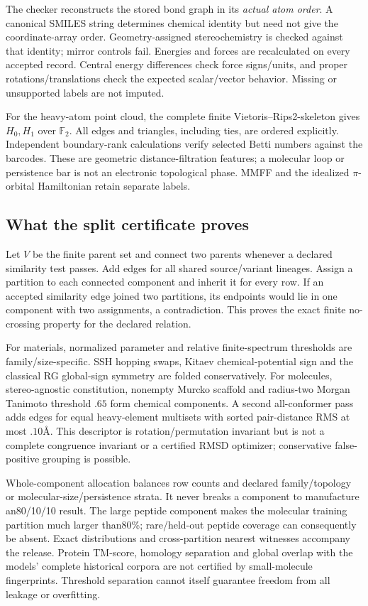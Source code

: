 \documentclass[11pt,oneside,openany]{book}
\theoremstyle{definition}\newtheorem{definition}[theorem]{Definition}
\theoremstyle{remark}\newtheorem{remark}[theorem]{Remark}
\begin{document}
The checker reconstructs the stored bond graph in its \emph{actual atom order}.
A canonical SMILES string determines chemical identity but need not give the
coordinate-array order. Geometry-assigned stereochemistry is checked against
that identity; mirror controls fail. Energies and forces are recalculated on
every accepted record. Central energy differences check force signs/units,
and proper rotations/translations check the expected scalar/vector behavior.
Missing or unsupported labels are not imputed.

For the heavy-atom point cloud, the complete finite Vietoris--Rips2-skeleton
gives $H_0,H_1$ over $\mathbb F_2$. All edges and triangles, including ties,
are ordered explicitly. Independent boundary-rank calculations verify selected
Betti numbers against the barcodes. These are geometric distance-filtration
features; a molecular loop or persistence bar is not an electronic topological
phase. MMFF and the idealized $\pi$-orbital Hamiltonian retain separate labels.

\subsection{What the split certificate proves}
Let $V$ be the finite parent set and connect two parents whenever a declared
similarity test passes. Add edges for all shared source/variant lineages.
Assign a partition to each connected component and inherit it for every row.
If an accepted similarity edge joined two partitions, its endpoints would lie
in one component with two assignments, a contradiction. This proves the exact
finite no-crossing property for the declared relation.

For materials, normalized parameter and relative finite-spectrum thresholds
are family/size-specific. SSH hopping swaps, Kitaev chemical-potential sign
and the classical RG global-sign symmetry are folded conservatively. For
molecules, stereo-agnostic constitution, nonempty Murcko scaffold and
radius-two Morgan Tanimoto threshold $.65$ form chemical components. A second
all-conformer pass adds edges for equal heavy-element multisets with sorted
pair-distance RMS at most $.10$\AA. This descriptor is rotation/permutation
invariant but is not a complete congruence invariant or a certified RMSD
optimizer; conservative false-positive grouping is possible.

Whole-component allocation balances row counts and declared family/topology
or molecular-size/persistence strata. It never breaks a component to manufacture
an80/10/10 result. The large peptide component makes the molecular training
partition much larger than80\%; rare/held-out peptide coverage can consequently
be absent. Exact distributions and cross-partition nearest witnesses accompany
the release. Protein TM-score, homology separation and global overlap with the
models' complete historical corpora are not certified by small-molecule
fingerprints. Threshold separation cannot itself guarantee freedom from all
leakage or overfitting.
\end{document}

